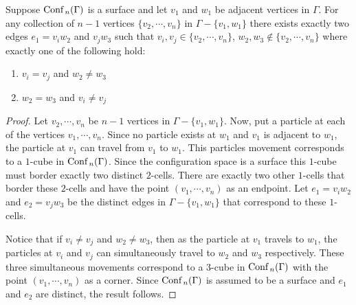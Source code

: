 \begin{lem}
    \label{lem:is_surface_1}
    Suppose \(\text{Conf}\,_n(\Gamma)\) is a surface and let \(v_1\) and \(w_1\) be adjacent vertices in \(\Gamma\).
    For any collection of \(n-1\) vertices \(\{v_2, \cdots, v_n\}\) in \(\Gamma - \{v_1, w_1\}\) there exists exactly two edges \(e_1 = v_i w_2\) and \(v_j w_3\)
    such that \(v_i, v_j \in \{v_2, \cdots, v_n\}\), \(w_2, w_3 \not \in \{v_2, \cdots, v_n\}\) where exactly one of the following hold:
    \begin{enumerate}
        \item \(v_i = v_j\) and \(w_2 \neq w_3\)
        \item \(w_2 = w_3\) and \(v_i \neq v_j\)
    \end{enumerate}
\end{lem}
\begin{proof}
    Let \(v_2, \cdots, v_n\) be \(n-1\) vertices in \(\Gamma - \{v_1, w_1\}\).   
    Now, put a particle at each of the vertices \(v_1, \cdots, v_n\).
    Since no particle exists at \(w_1\) and \(v_1\) is adjacent to \(w_1\), 
    the particle at \(v_1\) can travel from \(v_1\) to \(w_1\).
    This particles movement corresponds to a \(1\)-cube in \(\text{Conf}\,_n(\Gamma)\).
    Since the configuration space is a surface this \(1\)-cube must border exactly two distinct \(2\)-cells.
    There are exactly two other \(1\)-cells that border these \(2\)-cells and have the point \((v_1, \cdots, v_n)\) as an endpoint. 
    Let \(e_1 = v_i w_2\) and \(e_2 = v_j w_3\) be the distinct edges in \(\Gamma - \{v_1, w_1\}\) that correspond to these \(1\)-cells.
    
    Notice that if \(v_i \neq v_j\) and \(w_2 \neq w_3\), then as the particle at \(v_1\) travels to \(w_1\), the particles
    at \(v_i\) and \(v_j\) can simultaneously travel to \(w_2\) and \(w_3\) respectively. These three simultaneous movements correspond
    to a \(3\)-cube in \(\text{Conf}\,_n(\Gamma)\) with the point \((v_1, \cdots, v_n)\) as a corner.
    Since \(\text{Conf}\,_n(\Gamma)\) is assumed to be a surface and \(e_1\) and \(e_2\) are distinct, 
    the result follows.
\end{proof}

